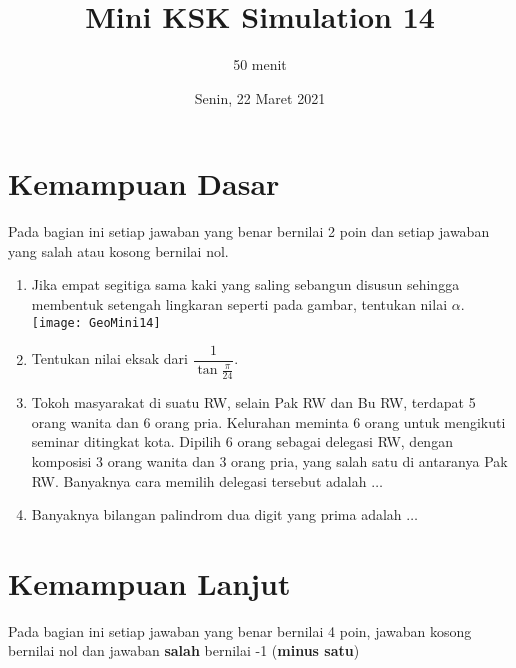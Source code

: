 \documentclass{article}
\title{Mini KSK Simulation 14}
\author{50 menit}
\date{Senin, 22 Maret 2021}
\begin{document}
	\maketitle
	
	\section{Kemampuan Dasar}
	Pada bagian ini setiap jawaban yang benar bernilai 2 poin dan setiap jawaban yang salah
	atau kosong bernilai nol.
	\begin{enumerate}
		\item Jika empat segitiga sama kaki yang saling sebangun disusun sehingga membentuk setengah lingkaran seperti pada gambar, tentukan nilai $\alpha$.\\
		\texttt{[image: GeoMini14]}
		
		\item Tentukan nilai eksak dari $\dfrac{1}{\tan \frac{\pi}{24}}$.
		
		\item Tokoh masyarakat di suatu RW, selain Pak RW dan Bu RW, terdapat 5 orang wanita
		dan 6 orang pria. Kelurahan meminta 6 orang untuk mengikuti seminar ditingkat kota.
		Dipilih 6 orang sebagai delegasi RW, dengan komposisi 3 orang wanita dan 3 orang
		pria, yang salah satu di antaranya Pak RW. Banyaknya cara memilih delegasi tersebut
		adalah $\dots$
		
		\item Banyaknya bilangan palindrom dua digit yang prima adalah $\dots$
	\end{enumerate}

\section{Kemampuan Lanjut}
Pada bagian ini setiap jawaban yang benar bernilai 4 poin, jawaban kosong bernilai nol
dan jawaban \textbf{salah} bernilai -1 (\textbf{minus satu})
\end{document}
